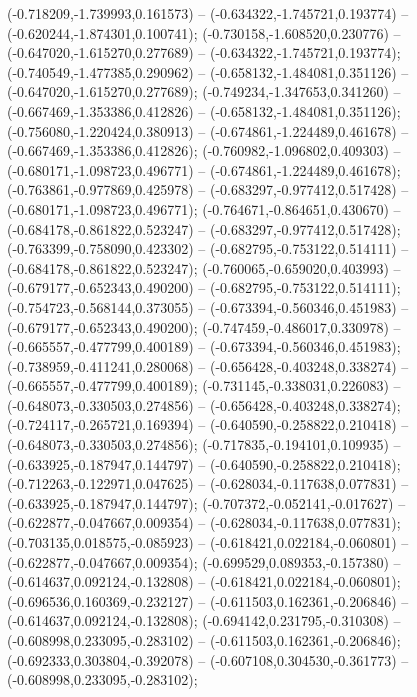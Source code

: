  (-0.718209,-1.739993,0.161573) -- (-0.634322,-1.745721,0.193774) -- (-0.620244,-1.874301,0.100741);
 (-0.730158,-1.608520,0.230776) -- (-0.647020,-1.615270,0.277689) -- (-0.634322,-1.745721,0.193774);
 (-0.740549,-1.477385,0.290962) -- (-0.658132,-1.484081,0.351126) -- (-0.647020,-1.615270,0.277689);
 (-0.749234,-1.347653,0.341260) -- (-0.667469,-1.353386,0.412826) -- (-0.658132,-1.484081,0.351126);
 (-0.756080,-1.220424,0.380913) -- (-0.674861,-1.224489,0.461678) -- (-0.667469,-1.353386,0.412826);
 (-0.760982,-1.096802,0.409303) -- (-0.680171,-1.098723,0.496771) -- (-0.674861,-1.224489,0.461678);
 (-0.763861,-0.977869,0.425978) -- (-0.683297,-0.977412,0.517428) -- (-0.680171,-1.098723,0.496771);
 (-0.764671,-0.864651,0.430670) -- (-0.684178,-0.861822,0.523247) -- (-0.683297,-0.977412,0.517428);
 (-0.763399,-0.758090,0.423302) -- (-0.682795,-0.753122,0.514111) -- (-0.684178,-0.861822,0.523247);
 (-0.760065,-0.659020,0.403993) -- (-0.679177,-0.652343,0.490200) -- (-0.682795,-0.753122,0.514111);
 (-0.754723,-0.568144,0.373055) -- (-0.673394,-0.560346,0.451983) -- (-0.679177,-0.652343,0.490200);
 (-0.747459,-0.486017,0.330978) -- (-0.665557,-0.477799,0.400189) -- (-0.673394,-0.560346,0.451983);
 (-0.738959,-0.411241,0.280068) -- (-0.656428,-0.403248,0.338274) -- (-0.665557,-0.477799,0.400189);
 (-0.731145,-0.338031,0.226083) -- (-0.648073,-0.330503,0.274856) -- (-0.656428,-0.403248,0.338274);
 (-0.724117,-0.265721,0.169394) -- (-0.640590,-0.258822,0.210418) -- (-0.648073,-0.330503,0.274856);
 (-0.717835,-0.194101,0.109935) -- (-0.633925,-0.187947,0.144797) -- (-0.640590,-0.258822,0.210418);
 (-0.712263,-0.122971,0.047625) -- (-0.628034,-0.117638,0.077831) -- (-0.633925,-0.187947,0.144797);
 (-0.707372,-0.052141,-0.017627) -- (-0.622877,-0.047667,0.009354) -- (-0.628034,-0.117638,0.077831);
 (-0.703135,0.018575,-0.085923) -- (-0.618421,0.022184,-0.060801) -- (-0.622877,-0.047667,0.009354);
 (-0.699529,0.089353,-0.157380) -- (-0.614637,0.092124,-0.132808) -- (-0.618421,0.022184,-0.060801);
 (-0.696536,0.160369,-0.232127) -- (-0.611503,0.162361,-0.206846) -- (-0.614637,0.092124,-0.132808);
 (-0.694142,0.231795,-0.310308) -- (-0.608998,0.233095,-0.283102) -- (-0.611503,0.162361,-0.206846);
 (-0.692333,0.303804,-0.392078) -- (-0.607108,0.304530,-0.361773) -- (-0.608998,0.233095,-0.283102);
